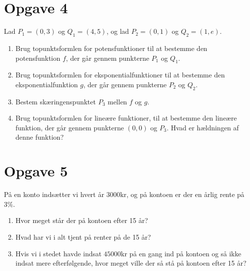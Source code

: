 \section*{Opgave 4}
Lad $P_1 = (0,3)$ og $Q_1 = (4,5)$, og lad $P_2 = (0,1)$ og $Q_2 = (1,e)$. 
\begin{enumerate}[label=\roman*)]
\item Brug topunktsformlen for potensfunktioner til at bestemme den potensfunktion $f$, der går gennem punkterne $P_1$ og $Q_1$.
\item Brug topunktsformlen for eksponentialfunktioner til at bestemme den eksponentialfunktion $g$, der går gennem punkterne $P_2$ og $Q_2$. 
\item Bestem skæringenspunktet $P_3$ mellen $f$ og $g$. 
\item Brug topunktsformlen for lineære funktioner, til at bestemme den lineære funktion, der går gennem punkterne $(0,0)$ og $P_3$. Hvad er hældningen af denne funktion?
\end{enumerate}

\section*{Opgave 5}
På en konto indsætter vi hvert år $3000$kr, og på kontoen er der en årlig rente på $3\%$. 
\begin{enumerate}[label=\roman*)]
\item Hvor meget står der på kontoen efter 15 år?
\item Hvad har vi i alt tjent på renter på de 15 år?
\item Hvis vi i stedet havde indsat $45000$kr på en gang ind på kontoen og så ikke indsat mere efterfølgende, hvor meget ville der så stå på kontoen efter 15 år?
\end{enumerate}